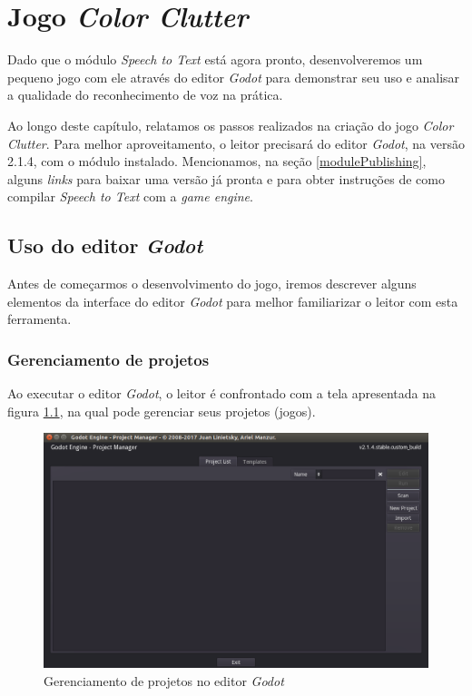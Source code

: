 \chapter{Jogo \textit{Color Clutter}}
\label{cap:color-clutter}

Dado que o módulo \textit{Speech to Text} está agora pronto, desenvolveremos um pequeno jogo com ele através do editor \textit{Godot} para demonstrar seu uso e analisar a qualidade do reconhecimento de voz na prática.

Ao longo deste capítulo, relatamos os passos realizados na criação do jogo \textit{Color Clutter}. Para melhor aproveitamento, o leitor precisará do editor \textit{Godot}, na versão 2.1.4, com o módulo instalado. Mencionamos, na seção \ref{modulePublishing}, alguns \textit{links} para baixar uma versão já pronta e para obter instruções de como compilar \textit{Speech to Text} com a \textit{game engine}.


\section{Uso do editor \textit{Godot}}

Antes de começarmos o desenvolvimento do jogo, iremos descrever alguns elementos da interface do editor \textit{Godot} para melhor familiarizar o leitor com esta ferramenta.


\subsection{Gerenciamento de projetos}

Ao executar o editor \textit{Godot}, o leitor é confrontado com a tela apresentada na figura \ref{editor-project-select}, na qual pode gerenciar seus projetos (jogos).

\begin{figure}[H]
  \centering
  \includegraphics[width=.85\textwidth]{image/editor-project-select}
  \caption{Gerenciamento de projetos no editor \textit{Godot}}
  \label{editor-project-select}
\end{figure}

